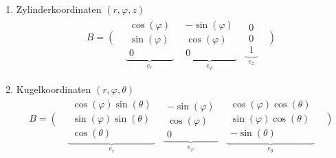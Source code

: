 \documentclass[a4paper,twocolumn,10pt]{article}
\begin{document}
\begin{enumerate}[label=$\bullet$]
\item Zylinderkoordinaten $(r,\varphi,z)$
\begin{equation*}
\begin{matrix}B=\left(\begin{matrix}\;\\ \; \\ \;\end{matrix}\right.\underbrace{\begin{matrix}\cos(\varphi) \\ \sin(\varphi) \\ 0\end{matrix}}_{e_r} & \underbrace{\begin{matrix}-\sin(\varphi) \\ \cos(\varphi) \\ 0\end{matrix}}_{e_{\varphi}} & \underbrace{\begin{matrix}0 \\ 0 \\ 1\end{matrix}}_{e_z}\left.\begin{matrix}\;\\ \; \\ \;\end{matrix}\right)\end{matrix}
\end{equation*}
\item Kugelkoordinaten $(r,\varphi,\theta)$
\begin{equation*}
\begin{matrix}B=\left(\begin{matrix}\;\\ \; \\ \;\end{matrix}\right.\underbrace{\begin{matrix}\cos(\varphi)\sin(\theta) \\ \sin(\varphi)\sin(\theta) \\ \cos(\theta)\end{matrix}}_{e_r} & \underbrace{\begin{matrix}-\sin(\varphi) \\ \cos(\varphi) \\ 0\end{matrix}}_{e_{\varphi}} & \underbrace{\begin{matrix}\cos(\varphi)\cos(\theta) \\ \sin(\varphi)\cos(\theta) \\ -\sin(\theta)\end{matrix}}_{e_{\theta}}\left.\begin{matrix}\;\\ \; \\ \;\end{matrix}\right)\end{matrix}
\end{equation*}
\end{enumerate}
\end{document}
